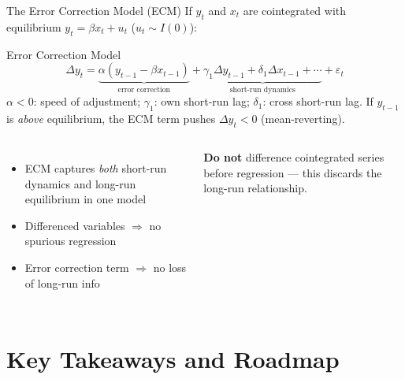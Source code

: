 \documentclass[aspectratio=169, 11pt]{beamer}
\begin{document}
\begin{frame}{The Error Correction Model (ECM)}
  If $y_t$ and $x_t$ are cointegrated with equilibrium
  $y_t = \beta x_t + u_t$ ($u_t \sim I(0)$):
  \begin{definitionbox}{Error Correction Model}
    {\small
    \[
      \Delta y_t
      = \underbrace{\alpha(y_{t-1} - \beta x_{t-1})}_{\text{error correction}}
      + \underbrace{\gamma_1 \Delta y_{t-1} + \delta_1 \Delta x_{t-1}
                   + \cdots}_{\text{short-run dynamics}}
      + \varepsilon_t
    \]
    $\alpha < 0$: speed of adjustment;
    $\gamma_1$: own short-run lag; $\delta_1$: cross short-run lag.
    If $y_{t-1}$ is \emph{above} equilibrium, the ECM term pushes
    $\Delta y_t < 0$ (mean-reverting).}
  \end{definitionbox}
  \begin{columns}[T]
      \begin{itemize}\small
        \item ECM captures \emph{both} short-run dynamics and
              long-run equilibrium in one model
        \item Differenced variables $\Rightarrow$ no spurious regression
        \item Error correction term $\Rightarrow$ no loss of long-run info
      \end{itemize}
      \begin{warningbox}
        {\small \textbf{Do not} difference cointegrated series before
        regression --- this discards the long-run relationship.}
      \end{warningbox}
  \end{columns}
\end{frame}

\section{Key Takeaways and Roadmap}

\end{document}
